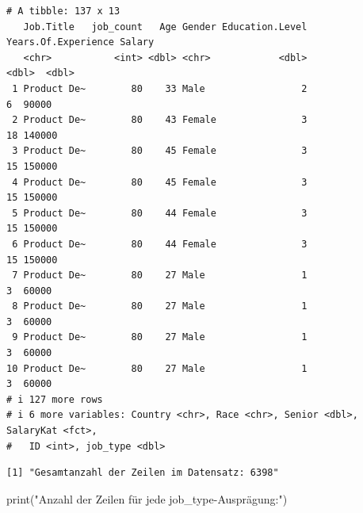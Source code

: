 \documentclass[
  letterpaper,
  DIV=11,
  numbers=noendperiod]{scrartcl}
\newenvironment{Shaded}{\begin{snugshade}}{\end{snugshade}}
\newcommand{\AttributeTok}[1]{\textcolor[rgb]{0.40,0.45,0.13}{#1}}
\newcommand{\FunctionTok}[1]{\textcolor[rgb]{0.28,0.35,0.67}{#1}}
\newcommand{\NormalTok}[1]{\textcolor[rgb]{0.00,0.23,0.31}{#1}}
\newcommand{\OtherTok}[1]{\textcolor[rgb]{0.00,0.23,0.31}{#1}}
\newcommand{\SpecialCharTok}[1]{\textcolor[rgb]{0.37,0.37,0.37}{#1}}
\newcommand{\StringTok}[1]{\textcolor[rgb]{0.13,0.47,0.30}{#1}}
\begin{document}
\begin{verbatim}
# A tibble: 137 x 13
   Job.Title   job_count   Age Gender Education.Level Years.Of.Experience Salary
   <chr>           <int> <dbl> <chr>            <dbl>               <dbl>  <dbl>
 1 Product De~        80    33 Male                 2                   6  90000
 2 Product De~        80    43 Female               3                  18 140000
 3 Product De~        80    45 Female               3                  15 150000
 4 Product De~        80    45 Female               3                  15 150000
 5 Product De~        80    44 Female               3                  15 150000
 6 Product De~        80    44 Female               3                  15 150000
 7 Product De~        80    27 Male                 1                   3  60000
 8 Product De~        80    27 Male                 1                   3  60000
 9 Product De~        80    27 Male                 1                   3  60000
10 Product De~        80    27 Male                 1                   3  60000
# i 127 more rows
# i 6 more variables: Country <chr>, Race <chr>, Senior <dbl>, SalaryKat <fct>,
#   ID <int>, job_type <dbl>
\end{verbatim}

\begin{Shaded}
\end{Shaded}

\begin{verbatim}
[1] "Gesamtanzahl der Zeilen im Datensatz: 6398"
\end{verbatim}

\begin{Shaded}
\begin{Highlighting}[]
\FunctionTok{print}\NormalTok{(}\StringTok{"Anzahl der Zeilen für jede job\_type{-}Ausprägung:"}\NormalTok{)}
\end{Highlighting}
\end{Shaded}
\end{document}
